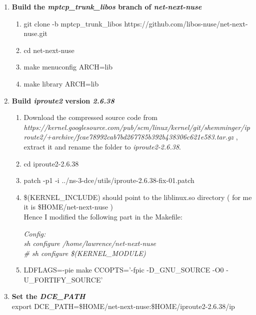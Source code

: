 \documentclass[a4paper,11pt]{article}
\begin{document}
\begin{enumerate}
\begin{enumerate}
\begin{enumerate}
						\end{enumerate}

					\item \textbf{Build the \emph{mptcp\_trunk\_libos} branch of \emph{net-next-nuse}}
						\begin{enumerate}

							\item git clone -b mptcp\_trunk\_libos https://github.com/libos-nuse/net-next-nuse.git
							\item cd net-next-nuse
							\item make menuconfig ARCH=lib
							\item make library ARCH=lib

						\end{enumerate}

					\item \textbf{Build \emph{iproute2} version \emph{2.6.38}}

						\begin{enumerate}
							\item Download the compressed source code from \\
							\nohyphens{\emph{https://kernel.googlesource.com/pub/scm/linux/kernel/git/shemminger/iproute2/+archive/fcae78992cab7bd267785b392b438306c621e583.tar.gz}} , extract it and rename the folder to \emph{iproute2-2.6.38}. 
							\item cd iproute2-2.6.38
							\item patch -p1 -i ../ns-3-dce/utils/iproute-2.6.38-fix-01.patch
							\item \$(KERNEL\_INCLUDE) should point to the liblinux.so directory ( for me it is \$HOME/net-next-nuse ) \\
    						Hence I modified the following part in the Makefile:

    						\emph{
    						Config: \\
                               \hspace*{2cm}sh configure /home/lawrence/net-next-nuse \\
                               \hspace*{2cm}\# sh configure \$(KERNEL\_MODULE) }
                             \item \nohyphens{LDFLAGS=-pie make CCOPTS='-fpic -D\_GNU\_SOURCE -O0 -U\_FORTIFY\_SOURCE'}

						\end{enumerate}

					\item \textbf{Set the \emph{DCE\_PATH}} \\
						export DCE\_PATH=\$HOME/net-next-nuse:\$HOME/iproute2-2.6.38/ip


\end{enumerate}
\end{enumerate}
\end{document}
